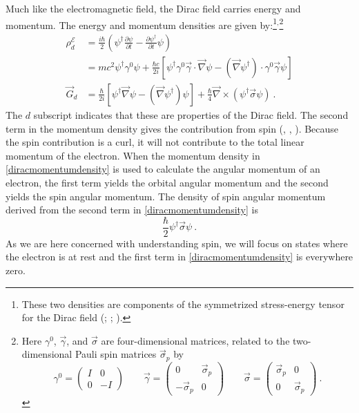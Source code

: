 \documentclass[12pt,secnumarabic,amsmath,amssymb,balancelastpage,nofootinbib]{article}
\begin{document}
Much like the electromagnetic field, the Dirac field carries energy and momentum.  The energy and momentum densities are given by:\footnote{These two densities are components of the symmetrized stress-energy tensor for the Dirac field (\citealp[section 20]{wentzel}; \citealp[appendix 7]{heitler}; \citealp[pg.\ 218--221]{weyl}).}$^,$\footnote{Here $\gamma^0$, $\vec{\gamma}$, and $\vec{\sigma}$ are four-dimensional matrices, related to the two-dimensional Pauli spin matrices $\vec{\sigma}_p$ by
\begin{equation}
\gamma^0=\left(\begin{matrix} I & 0 \\  0 & -I \end{matrix}\right)
\quad\quad
\vec{\gamma}=\left(\begin{matrix}0 & \vec{\sigma}_p \\  -\vec{\sigma}_p & 0 \end{matrix}\right)
\quad\quad
\vec{\sigma}=\left(\begin{matrix}\vec{\sigma}_p & 0 \\ 0 & \vec{\sigma}_p \end{matrix}\right)\ .
\label{matrixdefs}
\end{equation}}
\begin{align}
\rho_d^{\mathcal{E}}&=\frac{i \hbar}{2}\left(\psi^\dagger\frac{\partial \psi}{\partial t}-\frac{\partial \psi^\dagger}{\partial t}\psi\right)
\nonumber
\\
&=m c^2 \psi^\dagger\gamma^0\psi + \frac{\hbar c}{2i}\left[\psi^\dagger\gamma^0\vec{\gamma}\cdot\vec{\nabla}\psi-(\vec{\nabla} \psi^\dagger)\cdot\gamma^0\vec{\gamma}\psi\right] 
\label{diracenergydensity}
\\
\vec{G}_d&=\frac{\hbar}{2 i}\left[\psi^\dagger \vec{\nabla} \psi - (\vec{\nabla} \psi^\dagger)\psi \right]+\frac{\hbar}{4}\vec{\nabla}\times(\psi^\dagger \vec{\sigma} \psi)\ .
\label{diracmomentumdensity}
\end{align}
The $d$ subscript indicates that these are properties of the Dirac field.    The second term in the momentum density gives the contribution from spin (\citealp[pg.\ 181--182]{wentzel}, \citealp[pg.\ 168]{pauli}, \citealp[pg.\ 503]{ohanian}).  Because the spin contribution is a curl, it will not contribute to the total linear momentum of the electron.  When the momentum density in \eqref{diracmomentumdensity} is used to calculate the angular momentum of an electron, the first term yields the orbital angular momentum and the second yields the spin angular momentum.  The density of spin angular momentum derived from the second term in \eqref{diracmomentumdensity} is
\begin{equation}
\frac{\hbar}{2}\psi^\dagger \vec{\sigma} \psi\ .
\label{diracspinangularmomentumdensity}
\end{equation}
As we are here concerned with understanding spin, we will focus on states where the electron is at rest and the first term in \eqref{diracmomentumdensity} is everywhere zero.
\end{document}
